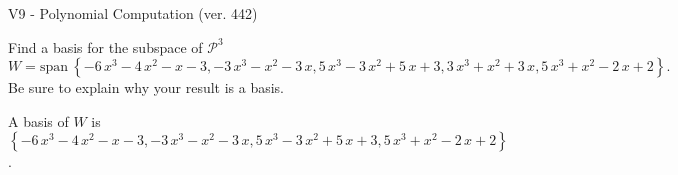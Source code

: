 \begin{exercise}
  \begin{exerciseTitle}V9 - Polynomial Computation (ver. 442)\end{exerciseTitle}
  \begin{exerciseStatement}
    Find a basis for the subspace of \(\mathcal{P}^3\) 
\[W=\mathrm{span}\ \left\{-6 \, x^{3} - 4 \, x^{2} - x - 3 , -3 \, x^{3} - x^{2} - 3 \, x , 5 \, x^{3} - 3 \, x^{2} + 5 \, x + 3 , 3 \, x^{3} + x^{2} + 3 \, x , 5 \, x^{3} + x^{2} - 2 \, x + 2\right\}.\]
 Be sure to explain why your result is a basis.


  \end{exerciseStatement}
  \begin{exerciseAnswer}
   A basis of \(W\) is  \(\left\{-6 \, x^{3} - 4 \, x^{2} - x - 3 , -3 \, x^{3} - x^{2} - 3 \, x , 5 \, x^{3} - 3 \, x^{2} + 5 \, x + 3 , 5 \, x^{3} + x^{2} - 2 \, x + 2\right\}\).
  


  \end{exerciseAnswer}
\end{exercise}